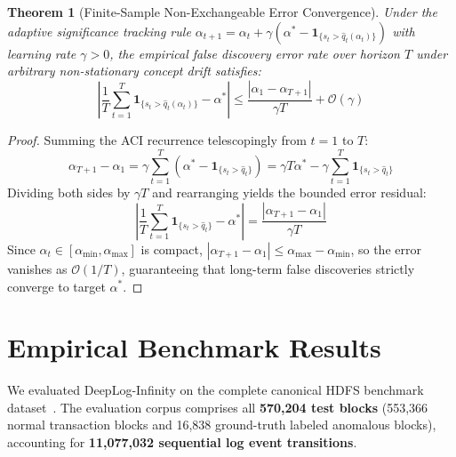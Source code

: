 \documentclass[letterpaper,twocolumn,10pt]{article}
\newtheorem{theorem}{Theorem}
\begin{document}
\begin{theorem}[Finite-Sample Non-Exchangeable Error Convergence]
\label{thm:conformal_convergence}
Under the adaptive significance tracking rule $\alpha_{t+1} = \alpha_t + \gamma (\alpha^* - \mathbf{1}_{\{s_t > \hat{q}_t(\alpha_t)\}})$ with learning rate $\gamma > 0$, the empirical false discovery error rate over horizon $T$ under arbitrary non-stationary concept drift satisfies:
\begin{equation}
\left| \frac{1}{T} \sum_{t=1}^T \mathbf{1}_{\{s_t > \hat{q}_t(\alpha_t)\}} - \alpha^* \right| \le \frac{|\alpha_1 - \alpha_{T+1}|}{\gamma T} + \mathcal{O}(\gamma)
\end{equation}
\end{theorem}
\begin{proof}
Summing the ACI recurrence telescopingly from $t=1$ to $T$:
\begin{equation}
\alpha_{T+1} - \alpha_1 = \gamma \sum_{t=1}^T (\alpha^* - \mathbf{1}_{\{s_t > \hat{q}_t\}}) = \gamma T \alpha^* - \gamma \sum_{t=1}^T \mathbf{1}_{\{s_t > \hat{q}_t\}}
\end{equation}
Dividing both sides by $\gamma T$ and rearranging yields the bounded error residual:
\begin{equation}
\left| \frac{1}{T} \sum_{t=1}^T \mathbf{1}_{\{s_t > \hat{q}_t\}} - \alpha^* \right| = \frac{|\alpha_{T+1} - \alpha_1|}{\gamma T}
\end{equation}
Since $\alpha_t \in [\alpha_{\min}, \alpha_{\max}]$ is compact, $|\alpha_{T+1} - \alpha_1| \le \alpha_{\max} - \alpha_{\min}$, so the error vanishes as $\mathcal{O}(1/T)$, guaranteeing that long-term false discoveries strictly converge to target $\alpha^*$.
\end{proof}

\section{Empirical Benchmark Results}
\label{sec:experiments}
We evaluated DeepLog-Infinity on the complete canonical HDFS benchmark dataset~\cite{du2017deeplog,shvachko2010hadoop}. The evaluation corpus comprises all \textbf{570,204 test blocks} (553,366 normal transaction blocks and 16,838 ground-truth labeled anomalous blocks), accounting for \textbf{11,077,032 sequential log event transitions}.
\end{document}
